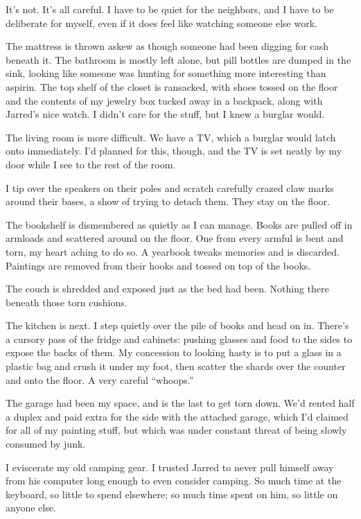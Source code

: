 It's not. It's all careful. I have to be quiet for the neighbors, and I have to be deliberate for myself, even if it does feel like watching someone else work.

The mattress is thrown askew as though someone had been digging for cash beneath it. The bathroom is mostly left alone, but pill bottles are dumped in the sink, looking like someone was hunting for something more interesting than aspirin. The top shelf of the closet is ransacked, with shoes tossed on the floor and the contents of my jewelry box tucked away in a backpack, along with Jarred's nice watch. I didn't care for the stuff, but I knew a burglar would.

The living room is more difficult. We have a TV, which a burglar would latch onto immediately. I'd planned for this, though, and the TV is set neatly by my door while I see to the rest of the room.

I tip over the speakers on their poles and scratch carefully crazed claw marks around their bases, a show of trying to detach them. They stay on the floor.

The bookshelf is dismembered as quietly as I can manage. Books are pulled off in armloads and scattered around on the floor. One from every armful is bent and torn, my heart aching to do so. A yearbook tweaks memories and is discarded. Paintings are removed from their hooks and tossed on top of the books.

The couch is shredded and exposed just as the bed had been. Nothing there beneath those torn cushions.

The kitchen is next. I step quietly over the pile of books and head on in. There's a cursory pass of the fridge and cabinets: pushing glasses and food to the sides to expose the backs of them. My concession to looking hasty is to put a glass in a plastic bag and crush it under my foot, then scatter the shards over the counter and onto the floor. A very careful ``whoops.''

The garage had been my space, and is the last to get torn down. We'd rented half a duplex and paid extra for the side with the attached garage, which I'd claimed for all of my painting stuff, but which was under constant threat of being slowly consumed by junk.

I eviscerate my old camping gear. I trusted Jarred to never pull himself away from his computer long enough to even consider camping. So much time at the keyboard, so little to spend elsewhere; so much time spent on him, so little on anyone else.

